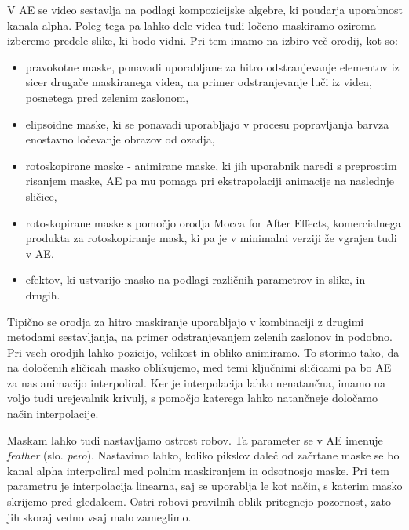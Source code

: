 \documentclass[a4paper, 12pt]{book}
\begin{document}
V AE se video sestavlja na podlagi kompozicijske algebre, ki poudarja uporabnost kanala alpha.
Poleg tega pa lahko dele videa tudi ločeno maskiramo oziroma izberemo predele slike, ki bodo vidni.
Pri tem imamo na izbiro več orodij, kot so:
\begin{itemize}
\item{pravokotne maske, ponavadi uporabljane za hitro odstranjevanje elementov iz sicer drugače maskiranega videa, na primer odstranjevanje luči iz videa, posnetega pred zelenim zaslonom,}
\item{elipsoidne maske, ki se ponavadi uporabljajo v procesu popravljanja barv\footnotemark za enostavno ločevanje obrazov od ozadja,}
\item{rotoskopirane maske - animirane maske, ki jih uporabnik naredi s preprostim risanjem maske, AE pa mu pomaga pri ekstrapolaciji animacije na naslednje sličice,}
\item{rotoskopirane maske s pomočjo orodja Mocca for After Effects, komercialnega produkta za rotoskopiranje mask, ki pa je v minimalni verziji že vgrajen tudi v AE,}
\item{efektov, ki ustvarijo masko na podlagi različnih parametrov in slike, in drugih.}
\end{itemize}

Tipično se orodja za hitro maskiranje uporabljajo v kombinaciji z drugimi metodami sestavljanja, na primer odstranjevanjem zelenih zaslonov in podobno.
Pri vseh orodjih lahko pozicijo, velikost in obliko animiramo. 
To storimo tako, da na določenih sličicah masko oblikujemo, med temi ključnimi sličicami pa bo AE za nas animacijo interpoliral. 
Ker je interpolacija lahko nenatančna, imamo na voljo tudi urejevalnik krivulj, s pomočjo katerega lahko natančneje določamo način interpolacije.

Maskam lahko tudi nastavljamo ostrost robov.
Ta parameter se v AE imenuje {\it feather} (slo. {\it pero}).
Nastavimo lahko, koliko pikslov daleč od začrtane maske se bo kanal alpha interpoliral med polnim maskiranjem in odsotnosjo maske.
Pri tem parametru je interpolacija linearna, saj se uporablja le kot način, s katerim masko skrijemo pred gledalcem.
Ostri robovi pravilnih oblik pritegnejo pozornost, zato jih skoraj vedno vsaj malo zameglimo.

\end{document}
